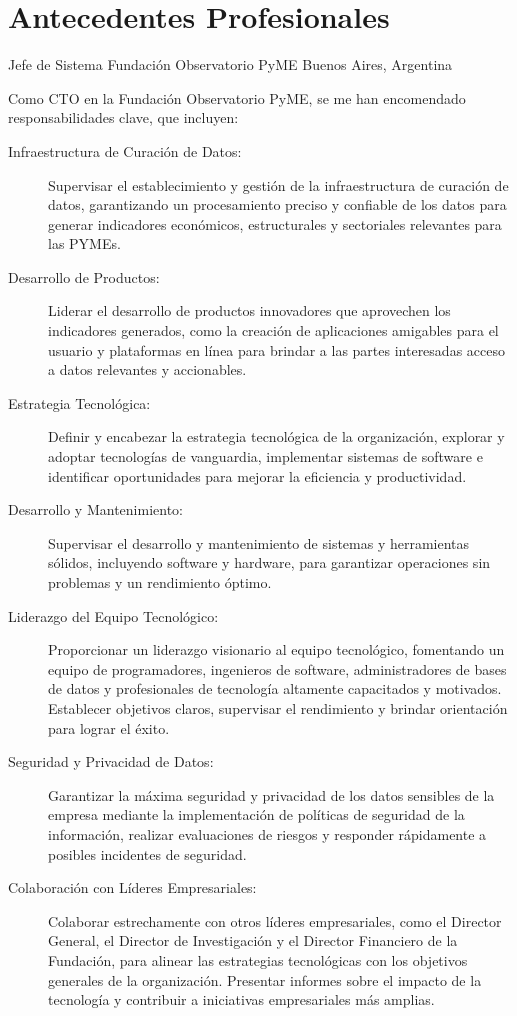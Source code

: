 \section{Antecedentes Profesionales}

	{Jefe de Sistema}
	{Fundación Observatorio PyME}
	{Buenos Aires, Argentina}
	{}
	{Como CTO en la Fundación Observatorio PyME, se me han encomendado responsabilidades clave, que incluyen:
	\begin{description}
		\item[Infraestructura de Curación de Datos:] Supervisar el establecimiento y gestión de la infraestructura de curación de datos, garantizando un procesamiento preciso y confiable de los datos para generar indicadores económicos, estructurales y sectoriales relevantes para las PYMEs.
		\item[Desarrollo de Productos:] Liderar el desarrollo de productos innovadores que aprovechen los indicadores generados, como la creación de aplicaciones amigables para el usuario y plataformas en línea para brindar a las partes interesadas acceso a datos relevantes y accionables.
		\item[Estrategia Tecnológica:] Definir y encabezar la estrategia tecnológica de la organización, explorar y adoptar tecnologías de vanguardia, implementar sistemas de software e identificar oportunidades para mejorar la eficiencia y productividad.
		\item[Desarrollo y Mantenimiento:] Supervisar el desarrollo y mantenimiento de sistemas y herramientas sólidos, incluyendo software y hardware, para garantizar operaciones sin problemas y un rendimiento óptimo.
		\item[Liderazgo del Equipo Tecnológico:] Proporcionar un liderazgo visionario al equipo tecnológico, fomentando un equipo de programadores, ingenieros de software, administradores de bases de datos y profesionales de tecnología altamente capacitados y motivados. Establecer objetivos claros, supervisar el rendimiento y brindar orientación para lograr el éxito.
		\item[Seguridad y Privacidad de Datos:] Garantizar la máxima seguridad y privacidad de los datos sensibles de la empresa mediante la implementación de políticas de seguridad de la información, realizar evaluaciones de riesgos y responder rápidamente a posibles incidentes de seguridad.
		\item[Colaboración con Líderes Empresariales:] Colaborar estrechamente con otros líderes empresariales, como el Director General, el Director de Investigación y el Director Financiero de la Fundación, para alinear las estrategias tecnológicas con los objetivos generales de la organización. Presentar informes sobre el impacto de la tecnología y contribuir a iniciativas empresariales más amplias.

\end{description}}
